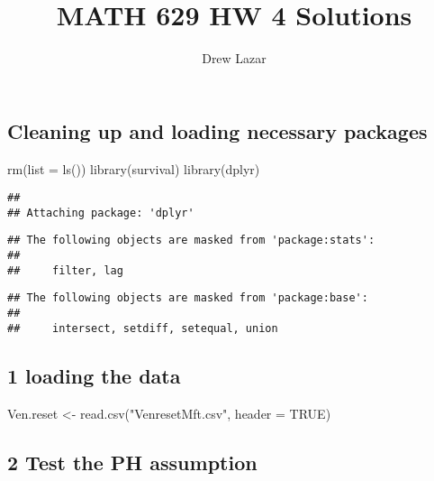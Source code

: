 \documentclass[
]{article}
\title{MATH 629 HW 4 Solutions}
\author{Drew Lazar}
\date{}
\newenvironment{Shaded}{\begin{snugshade}}{\end{snugshade}}
\newcommand{\AttributeTok}[1]{\textcolor[rgb]{0.77,0.63,0.00}{#1}}
\newcommand{\ConstantTok}[1]{\textcolor[rgb]{0.00,0.00,0.00}{#1}}
\newcommand{\FunctionTok}[1]{\textcolor[rgb]{0.00,0.00,0.00}{#1}}
\newcommand{\NormalTok}[1]{#1}
\newcommand{\OtherTok}[1]{\textcolor[rgb]{0.56,0.35,0.01}{#1}}
\newcommand{\StringTok}[1]{\textcolor[rgb]{0.31,0.60,0.02}{#1}}
\begin{document}
\maketitle

\hypertarget{cleaning-up-and-loading-necessary-packages}{%
\subsection{Cleaning up and loading necessary
packages}\label{cleaning-up-and-loading-necessary-packages}}

\begin{Shaded}
\begin{Highlighting}[]
\FunctionTok{rm}\NormalTok{(}\AttributeTok{list =} \FunctionTok{ls}\NormalTok{())}
\FunctionTok{library}\NormalTok{(survival)}
\FunctionTok{library}\NormalTok{(dplyr)}
\end{Highlighting}
\end{Shaded}

\begin{verbatim}
## 
## Attaching package: 'dplyr'
\end{verbatim}

\begin{verbatim}
## The following objects are masked from 'package:stats':
## 
##     filter, lag
\end{verbatim}

\begin{verbatim}
## The following objects are masked from 'package:base':
## 
##     intersect, setdiff, setequal, union
\end{verbatim}

\hypertarget{loading-the-data}{%
\subsection{1 loading the data}\label{loading-the-data}}

\begin{Shaded}
\begin{Highlighting}[]
\NormalTok{Ven.reset }\OtherTok{\textless{}{-}} \FunctionTok{read.csv}\NormalTok{(}\StringTok{"VenresetMft.csv"}\NormalTok{, }\AttributeTok{header =} \ConstantTok{TRUE}\NormalTok{)}
\end{Highlighting}
\end{Shaded}

\hypertarget{test-the-ph-assumption}{%
\subsection{2 Test the PH assumption}\label{test-the-ph-assumption}}
\end{document}
